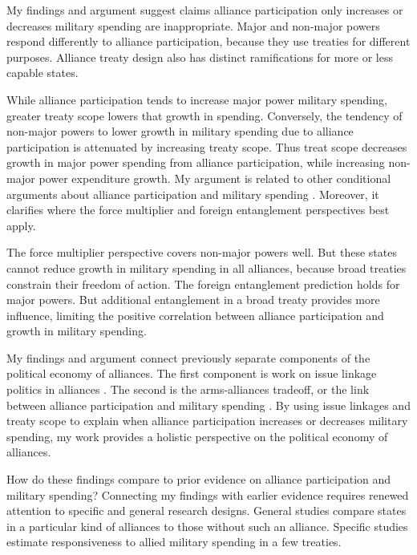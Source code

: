 \documentclass[12pt]{article}
\begin{document}
My findings and argument suggest claims alliance participation only increases or decreases military spending are inappropriate. 
Major and non-major powers respond differently to alliance participation, because they use treaties for different purposes. 
Alliance treaty design also has distinct ramifications for more or less capable states. 


While alliance participation tends to increase major power military spending, greater treaty scope lowers that growth in spending. 
Conversely, the tendency of non-major powers to lower growth in military spending due to alliance participation is attenuated by increasing treaty scope. 
Thus treat scope decreases growth in major power spending from alliance participation, while increasing non-major power expenditure growth. 
My argument is related to other conditional arguments about alliance participation and military spending \citep{DigiuseppePoast2016}.
Moreover, it clarifies where the force multiplier and foreign entanglement perspectives best apply. 



The force multiplier perspective covers non-major powers well. 
But these states cannot reduce growth in military spending in all alliances, because broad treaties constrain their freedom of action.
The foreign entanglement prediction holds for major powers. 
But additional entanglement in a broad treaty provides more influence, limiting the positive correlation between alliance participation and growth in military spending. 


My findings and argument connect previously separate components of the political economy of alliances. 
The first component is work on issue linkage politics in alliances \citep{Mattes2012, Poast2012, Poast2013, Johnson2015}.
The second is the arms-alliances tradeoff, or the link between alliance participation and military spending \citep{Morrow1993}. 
By using issue linkages and treaty scope to explain when alliance participation increases or decreases military spending, my work provides a holistic perspective on the political economy of alliances.  


How do these findings compare to prior evidence on alliance participation and military spending? 
Connecting my findings with earlier evidence requires renewed attention to specific and general research designs. 
General studies compare states in a particular kind of alliances to those without such an alliance. 
Specific studies estimate responsiveness to allied military spending in a few treaties. 
\end{document}
